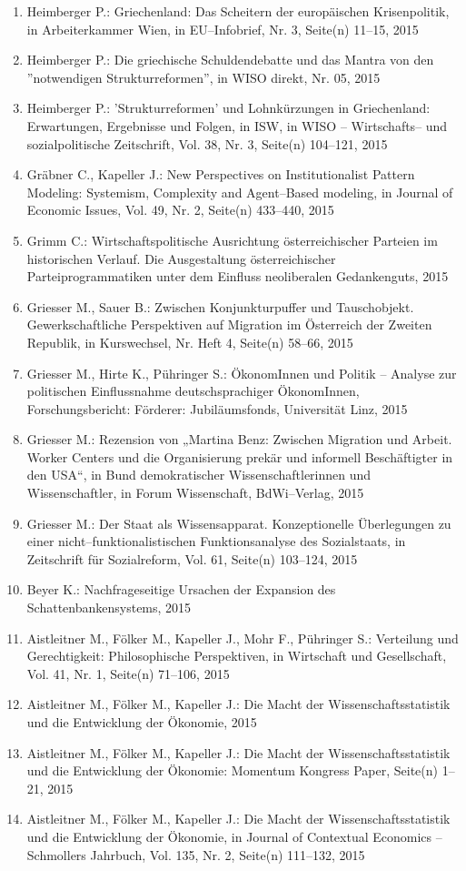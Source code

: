 \begin{enumerate}
	 \item Heimberger P.: Griechenland: Das Scheitern der europäischen Krisenpolitik, in Arbeiterkammer Wien, in EU--Infobrief, Nr. 3, Seite(n) 11--15, 2015
	 \item Heimberger P.: Die griechische Schuldendebatte und das Mantra von den ''notwendigen Strukturreformen'', in WISO direkt, Nr. 05, 2015
	 \item Heimberger P.: 'Strukturreformen' und Lohnkürzungen in Griechenland: Erwartungen, Ergebnisse und Folgen, in ISW, in WISO -- Wirtschafts-- und sozialpolitische Zeitschrift, Vol. 38, Nr. 3, Seite(n) 104--121, 2015
	 \item Gräbner C., Kapeller J.: New Perspectives on  Institutionalist Pattern Modeling: Systemism, Complexity and  Agent--Based modeling, in Journal of Economic Issues, Vol. 49, Nr. 2, Seite(n) 433--440, 2015
	 \item Grimm C.: Wirtschaftspolitische Ausrichtung österreichischer Parteien im historischen Verlauf. Die Ausgestaltung österreichischer Parteiprogrammatiken unter dem Einfluss neoliberalen Gedankenguts, 2015
	 \item Griesser M., Sauer B.: Zwischen Konjunkturpuffer und Tauschobjekt. Gewerkschaftliche Perspektiven auf Migration im Österreich der Zweiten Republik, in Kurswechsel, Nr. Heft 4, Seite(n) 58--66, 2015
	 \item Griesser M., Hirte K., Pühringer S.: ÖkonomInnen und Politik – Analyse zur politischen Einflussnahme deutschsprachiger ÖkonomInnen, Forschungsbericht: Förderer: Jubiläumsfonds, Universität Linz, 2015
	 \item Griesser M.: Rezension von „Martina Benz: Zwischen Migration und Arbeit. Worker Centers und die Organisierung prekär und informell Beschäftigter in den USA“, in Bund demokratischer Wissenschaftlerinnen und Wissenschaftler, in Forum Wissenschaft, BdWi--Verlag, 2015
	 \item Griesser M.: Der Staat als Wissensapparat. Konzeptionelle Überlegungen zu einer nicht--funktionalistischen Funktionsanalyse des Sozialstaats, in Zeitschrift für Sozialreform, Vol. 61, Seite(n) 103--124, 2015
	 \item Beyer K.: Nachfrageseitige Ursachen der Expansion des Schattenbankensystems, 2015
	 \item Aistleitner M., Fölker M., Kapeller J., Mohr F., Pühringer S.: Verteilung und Gerechtigkeit: Philosophische  Perspektiven, in Wirtschaft und Gesellschaft, Vol. 41, Nr. 1, Seite(n) 71--106, 2015
	 \item Aistleitner M., Fölker M., Kapeller J.: Die Macht der Wissenschaftsstatistik und die Entwicklung der Ökonomie, 2015
	 \item Aistleitner M., Fölker M., Kapeller J.: Die Macht der Wissenschaftsstatistik und die Entwicklung der Ökonomie: Momentum Kongress Paper, Seite(n) 1--21, 2015
	 \item Aistleitner M., Fölker M., Kapeller J.: Die Macht der Wissenschaftsstatistik und die Entwicklung der Ökonomie, in Journal of Contextual Economics – Schmollers Jahrbuch, Vol. 135, Nr. 2, Seite(n) 111–132, 2015
\end{enumerate}
